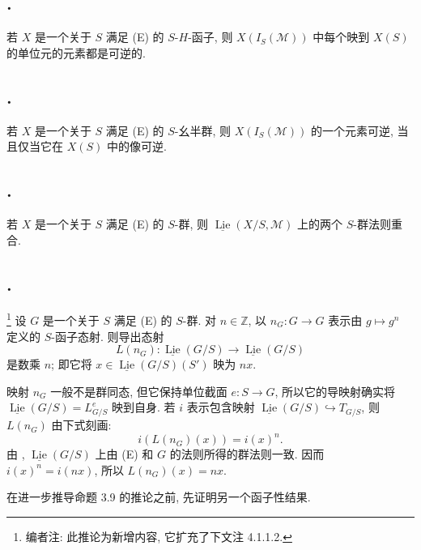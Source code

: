 \subsection*{.}
若 \(X\) 是一个关于 \(S\) 满足 (E) 的 \(S\)-\(H\)-函子,
则 \(X(I_S(\mathcal M))\) 中每个映到 \(X(S)\) 的单位元的元素都是可逆的.

\subsection*{.}
若 \(X\) 是一个关于 \(S\) 满足 (E) 的 \(S\)-幺半群,
则 \(X(I_S(\mathcal M))\) 的一个元素可逆,
当且仅当它在 \(X(S)\) 中的像可逆.

\subsection*{.}
若 \(X\) 是一个关于 \(S\) 满足 (E) 的 \(S\)-群,
则 \(\underline{\operatorname{Lie}}(X/S,\mathcal M)\)
上的两个 \(S\)-群法则重合.

\subsection*{.}
\footnote{编者注: 此推论为新增内容, 它扩充了下文注 4.1.1.2.}
设 \(G\) 是一个关于 \(S\) 满足 (E) 的 \(S\)-群.
对 \(n\in\mathbb Z\), 以 \(n_G:G\to G\) 表示由
\(g\mapsto g^n\) 定义的 \(S\)-函子态射. 则导出态射
\[
  L(n_G):\underline{\operatorname{Lie}}(G/S)\longrightarrow
  \underline{\operatorname{Lie}}(G/S)
\]
是数乘 \(n\); 即它将
\(x\in\underline{\operatorname{Lie}}(G/S)(S')\) 映为 \(nx\).

映射 \(n_G\) 一般不是群同态,
但它保持单位截面 \(e:S\to G\), 所以它的导映射确实将
\(\underline{\operatorname{Lie}}(G/S)=L^e_{G/S}\) 映到自身.
若 \(i\) 表示包含映射
\(\underline{\operatorname{Lie}}(G/S)\hookrightarrow T_{G/S}\),
则 \(L(n_G)\) 由下式刻画:
\[
  i(L(n_G)(x))=i(x)^n.
\]
由 ,
\(\underline{\operatorname{Lie}}(G/S)\) 上由 (E) 和 \(G\)
的法则所得的群法则一致. 因而
\(i(x)^n=i(nx)\), 所以 \(L(n_G)(x)=nx\).

在进一步推导命题 3.9 的推论之前, 先证明另一个函子性结果.


